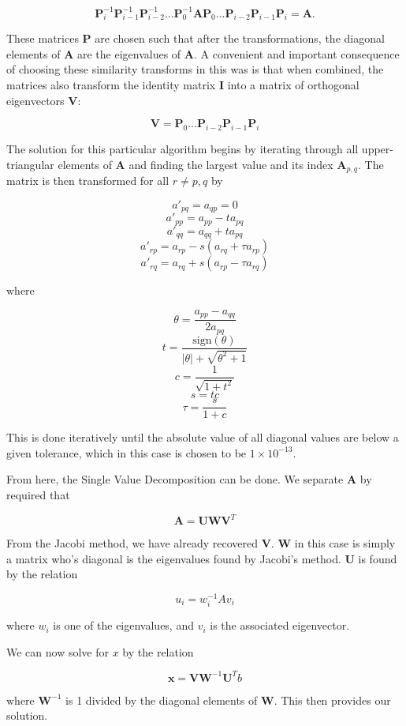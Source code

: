 \documentclass[10pt,letter]{article}
\begin{document}
$$\textbf{P}_i^{-1}\textbf{P}_{i-1}^{-1} \textbf{P}_{i-2}^{-1} ... \textbf{P}_0^{-1} \textbf{A}\textbf{P}_0 ...  \textbf{P}_{i-2}\textbf{P}_{i-1}\textbf{P}_i  = \textbf{A}.$$

These matrices \textbf{P} are chosen such that after the transformations, the diagonal elements of \textbf{A} are the eigenvalues of \textbf{A}. A convenient and important consequence of choosing these similarity transforms in this was is that when combined, the matrices also transform the identity matrix \textbf{I} into a matrix of orthogonal eigenvectors \textbf{V}:

$$ \textbf{V} = \textbf{P}_0 ...  \textbf{P}_{i-2}\textbf{P}_{i-1}\textbf{P}_i $$

The solution for this particular algorithm begins by iterating through all upper-triangular elements of \textbf{A} and finding the largest value and its index $\textbf{A}_{p,q}$. The matrix is then transformed for all $r \neq p,q$ by

$$a'_{pq} =a_{qp} = 0 $$
$$a'_{pp} =a_{pp} -ta_{pq} $$
$$a'_{qq} =a_{qq} +ta_{pq} $$
$$a'_{rp} =a_{rp} - s(a_{rq} + \tau a_{rp})$$
$$a'_{rq} =a_{rq} + s(a_{rp} - \tau a_{rq}) $$

where

$$\theta = \frac{a_{pp} - a_{qq}}{2a_{pq}} $$
$$t = \frac{\text{sign}(\theta)}{|\theta| + \sqrt{\theta^2 +1}}$$
$$ c = \frac{1}{\sqrt{1+t^2}} $$
$$ s = tc $$
$$\tau = \frac{s}{1+c} $$

This is done iteratively until the absolute value of all diagonal values are below a given tolerance, which in this case is chosen to be $1 \times 10^{-13}$.

From here, the Single Value Decomposition can be done. We separate \textbf{A} by required that 

$$\textbf{A} = \textbf{UWV}^T$$

From the Jacobi method, we have already recovered \textbf{V}. \textbf{W} in this case is simply a matrix who's diagonal is the eigenvalues found by Jacobi's method. \textbf{U} is found by the relation

$$u_i = w_i^{-1}Av_i $$

where $w_i$ is one of the eigenvalues, and $v_i$ is the associated eigenvector.

We can now solve for $x$ by the relation

$$\textbf{x} = \textbf{V}\textbf{W}^{-1}\textbf{U}^Tb$$

where $\textbf{W}^{-1}$ is 1 divided by the diagonal elements of \textbf{W}. This then provides our solution.
\end{document}
